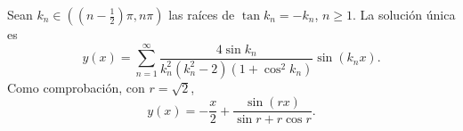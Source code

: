 Sean $k_n\in((n-\tfrac12)\pi,n\pi)$ las raíces de $\tan k_n=-k_n$, $n\ge1$. La solución única es
\[y(x)=\sum_{n=1}^\infty\frac{4\sin k_n}{k_n^2(k_n^2-2)(1+\cos^2k_n)}\sin(k_nx).\]
Como comprobación, con $r=\sqrt2$,
\[y(x)=-\frac x2+\frac{\sin(rx)}{\sin r+r\cos r}.\]
